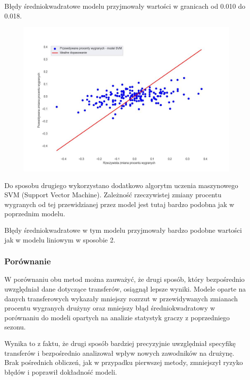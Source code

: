 \documentclass{article}
\begin{document}
Błędy średniokwadratowe modelu przyjmowały wartości w granicach od 0.010 do 0.018.
\newpage

\begin{figure}[htp]
    \centering
    \includegraphics[width=16cm]{svm_model.jpg}
    \label{fig:svm_model}
\end{figure}

Do sposobu drugiego wykorzystano dodatkowo algorytm uczenia maszynowego SVM (Support Vector Machine). Zależność rzeczywistej zmiany procentu wygranych od tej przewidzianej przez model jest tutaj bardzo podobna jak w poprzednim modelu.

Błędy średniokwadratowe w tym modelu przyjmowały bardzo podobne wartości jak w modelu liniowym w sposobie 2.

\subsubsection{Porównanie}

W porównaniu obu metod można zauważyć, że drugi sposób, który bezpośrednio uwzględniał dane dotyczące transferów, osiągnął lepsze wyniki. Modele oparte na danych transferowych wykazały mniejszy rozrzut w przewidywanych zmianach procentu wygranych drużyny oraz mniejszy błąd średniokwadratowy w porównaniu do modeli opartych na analizie statystyk graczy z poprzedniego sezonu.

Wynika to z faktu, że drugi sposób bardziej precyzyjnie uwzględniał specyfikę transferów i bezpośrednio analizował wpływ nowych zawodników na drużynę. Brak pośrednich obliczeń, jak w przypadku pierwszej metody, zmniejszył ryzyko błędów i poprawił dokładność modeli.
\newpage
\end{document}

